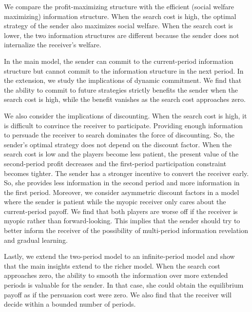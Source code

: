 \documentclass[11pt]{extarticle}
\begin{document}
We compare the profit-maximizing structure with the efficient (social welfare maximizing) information structure. When the search cost is high, the optimal strategy of the sender also maximizes social welfare. When the search cost is lower, the two information structures are different because the sender does not internalize the receiver's welfare.

In the main model, the sender can commit to the current-period information structure but cannot commit to the information structure in the next period. In the extension, we study the implications of dynamic commitment. We find that the ability to commit to future strategies strictly benefits the sender when the search cost is high, while the benefit vanishes as the search cost approaches zero. 

We also consider the implications of discounting. When the search cost is high, it is difficult to convince the receiver to participate. %
Providing enough information to persuade the receiver to search dominates the force of discounting. So, the sender's optimal strategy does not depend on the discount factor. When the search cost is low and the players become less patient, the present value of the second-period profit decreases and the first-period participation constraint becomes tighter. The sender has a stronger incentive to convert the receiver early. So, she provides less information in the second period and more information in the first period. Moreover, we consider asymmetric discount factors in a model where the sender is patient while the myopic receiver only cares about the current-period payoff. We find that both players are worse off if the receiver is myopic rather than forward-looking. This implies that the sender should try to better inform the receiver of the possibility of multi-period information revelation and gradual learning. 

Lastly, we extend the two-period model to an infinite-period model and show that the main insights extend to the richer model. When the search cost approaches zero, the ability to smooth the information over more extended periods is valuable for the sender. In that case, she could obtain the equilibrium payoff as if the persuasion cost were zero. We also find that the receiver will decide within a bounded number of periods.
\end{document}
